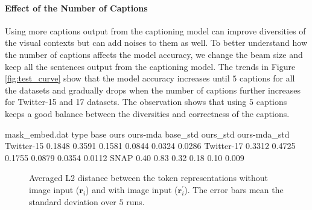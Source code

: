 \documentclass[11pt]{article}
\def\vr{{\bm{r}}}
\begin{document}
\paragraph{Effect of the Number of Captions}
Using more captions output from the captioning model can improve diversities of the visual contexts but can add noises to them as well. To better understand how the number of captions affects the model accuracy, we change the beam size and keep all the sentences output from the captioning model. The trends in Figure \ref{fig:test_curve} show that the model accuracy increases until $5$ captions for all the datasets and gradually drops when the number of captions further increases for Twitter-15 and 17 datasets. The observation shows that using $5$ captions keeps a good balance between the diversities and correctness of the captions.


\begin{filecontents}{mask_embed.dat}
type base ours ours-mda base_std ours_std ours-mda_std
Twitter-15 0.1848 0.3591 0.1581 0.0844 0.0324 0.0286
Twitter-17 0.3312 0.4725 0.1755 0.0879 0.0354 0.0112
SNAP 0.40 0.83 0.32 0.18 0.10 0.009
\end{filecontents}


\begin{figure}[t]
\centering
{}
\caption{Averaged L2 distance between the token representations without image input ($\vr_i$) and with image input ($\vr^\prime_i$). The error bars mean the standard deviation over $5$ runs.}
\label{fig:l2dist}
\end{figure}
\end{document}
